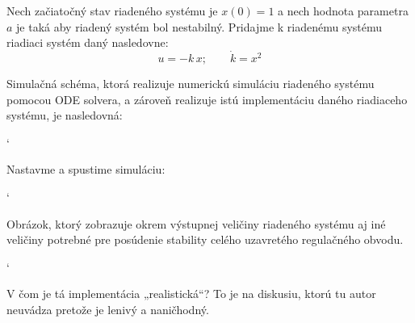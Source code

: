 \documentclass[a4paper, 10pt, ]{article}
\begin{document}
Nech začiatočný stav riadeného systému je $x(0) = 1$ a nech hodnota parametra $a$ je taká aby riadený systém bol nestabilný. Pridajme k riadenému systému riadiaci systém daný nasledovne:
\begin{equation}
	u = -k\, x; \qquad \dot{k} = x^2
\end{equation}


Simulačná schéma, ktorá realizuje numerickú simuláciu riadeného systému pomocou ODE solvera, a zároveň realizuje istú implementáciu daného riadiaceho systému, je nasledovná:


{\catcode`

}

\noindent
Nastavme a spustime simuláciu:

{\catcode`

}


\noindent
Obrázok, ktorý zobrazuje okrem výstupnej veličiny riadeného systému aj iné veličiny potrebné pre posúdenie stability celého uzavretého regulačného obvodu.

{\catcode`

}


\begin{centering}


    \vspace{-2mm}

    \figcaption{}

    \vspace{2mm}

    \label{figsc_ar02_f03_f01_0}

\end{centering}

\noindent
V čom je tá implementácia „realistická“? To je na diskusiu, ktorú tu autor neuvádza pretože je lenivý a naničhodný.
\end{document}
